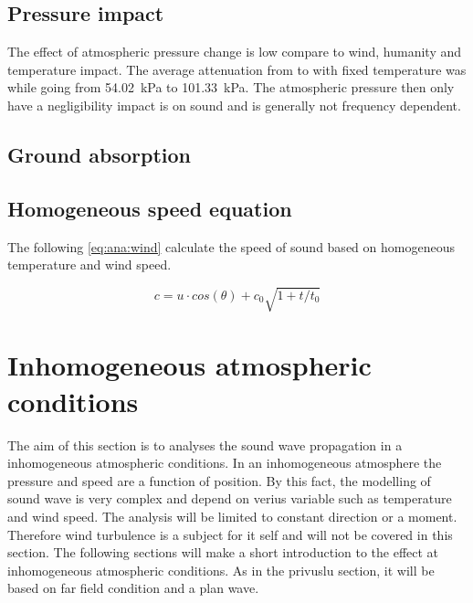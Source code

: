 
\subsection{Pressure impact}
The effect of atmospheric pressure change is low compare to wind, humanity and temperature impact. The average attenuation from  to  with fixed temperature was  while going from \SI{54.02}{\kilo\pascal} to \SI{101.33}{\kilo\pascal}. The atmospheric pressure then only have a negligibility impact is on sound and is generally not frequency dependent. 
 
 
\subsection{Ground absorption} 

 
 \subsection{Homogeneous speed equation}
 The following \autoref{eq:ana:wind} calculate the speed of sound based on homogeneous temperature and wind speed.

\begin{equation}\label{eq:ana:wind}
c = u \cdot cos(\theta) + c_0 \sqrt{1+t/t_0}
\end{equation}  

\startexplain
{}
\stopexplain


 
\section{Inhomogeneous atmospheric conditions} 
The aim of this section is to analyses the sound wave propagation in a inhomogeneous atmospheric conditions. In an inhomogeneous atmosphere the pressure and speed are a function of position. By this fact, the modelling of sound wave is very complex and depend on verius variable such as temperature and wind speed. The analysis will be limited to constant direction or a moment. Therefore wind turbulence is a subject for it self and will not be covered in this section. The following sections will make a short introduction to the effect at inhomogeneous atmospheric conditions. As in the privuslu section, it will be based on far field condition and a plan wave.
 
